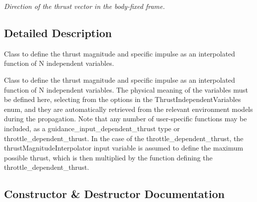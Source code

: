 \begin{DoxyCompactItemize}
\begin{DoxyCompactList}\small\item\em Direction of the thrust vector in the body-\/fixed frame. \end{DoxyCompactList}\end{DoxyCompactItemize}


\subsection{Detailed Description}
Class to define the thrust magnitude and specific impulse as an interpolated function of N independent variables. 

Class to define the thrust magnitude and specific impulse as an interpolated function of N independent variables. The physical meaning of the variables must be defined here, selecting from the options in the Thrust\+Independent\+Variables enum, and they are automatically retrieved from the relevant environment models during the propagation. Note that any number of user-\/specific functions may be included, as a guidance\+\_\+input\+\_\+dependent\+\_\+thrust type or throttle\+\_\+dependent\+\_\+thrust. In the case of the throttle\+\_\+dependent\+\_\+thrust, the thrust\+Magnitude\+Interpolator input variable is assumed to define the maximum possible thrust, which is then multiplied by the function defining the throttle\+\_\+dependent\+\_\+thrust. 

\subsection{Constructor \& Destructor Documentation}
